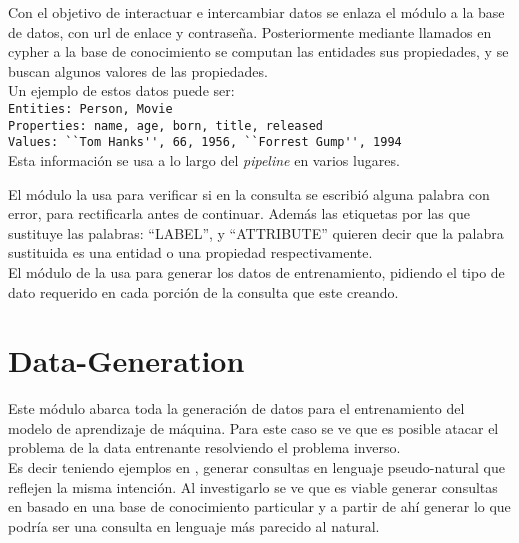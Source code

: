 Con el objetivo de interactuar e intercambiar datos se enlaza el m\'odulo a la base de datos, con url de enlace y contraseña. Posteriormente mediante llamados en cypher a la base de conocimiento se computan las entidades sus propiedades, y se buscan algunos valores de las propiedades. \\

Un ejemplo de estos datos puede ser:\\
\verb|Entities: Person, Movie|\\
\verb|Properties: name, age, born, title, released|\\
\verb|Values: ``Tom Hanks'', 66, 1956, ``Forrest Gump'', 1994|\\
        
Esta informaci\'on se usa a lo largo del \textit{pipeline} en varios lugares. 

El m\'odulo  la usa para verificar si en la consulta se escribi\'o alguna palabra con error, para rectificarla antes de continuar. Adem\'as las etiquetas por las que sustituye las palabras: ``LABEL'', y ``ATTRIBUTE'' quieren decir que la palabra  sustituida es una entidad o una propiedad respectivamente.\\

El m\'odulo de  la usa para generar los datos de entrenamiento, pidiendo el tipo de dato requerido en cada porci\'on de la consulta que este creando.\\



\section{Data-Generation}
\label{data-g}
Este m\'odulo abarca toda la generaci\'on de datos para el entrenamiento del modelo de aprendizaje de m\'aquina. Para este caso se ve que es posible atacar el problema de la data entrenante resolviendo el problema inverso.\\

Es decir teniendo ejemplos en , generar consultas en lenguaje pseudo-natural que reflejen la misma intención. Al investigarlo se ve que es viable generar consultas en  basado en una base de conocimiento particular y a partir de ah\'i generar lo que podr\'ia ser una consulta en lenguaje m\'as parecido al natural.\\

